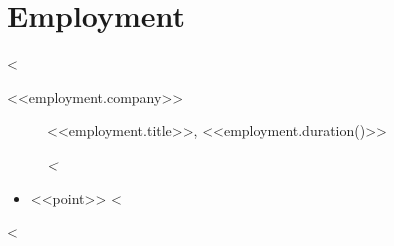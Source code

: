 \section{Employment}
<%
\begin{description}
    \item [<<employment.company>>] <<employment.title>>, <<employment.duration()>>
    \item [] \footnotesize\textsl{
    <%
    }
\end{description}
\begin{itemize}
    <%
    \item <<point>>
    <%
\end{itemize}
<%